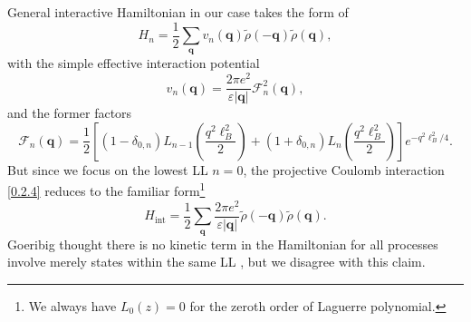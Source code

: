 \documentclass[bachelor,english,numbers]{ustcthesis}
\begin{document}
		General interactive Hamiltonian in our case takes the form of \cite{nomura2006quantum,goerbig2006electron}
		\begin{equation}\label{0.2.4}
			H_n=\dfrac{1}{2}\sum_{\bm{q}}v_n(\bm{q})\widetilde{\rho}(\bm{-q})\widetilde{\rho}(\bm{q}),  
		\end{equation}
		with the simple effective interaction potential
		\begin{equation*}
			v_n(\bm{q})=\dfrac{2\pi e^2}{\varepsilon|\bm{q}|}\mathcal{F}_n^2(\bm{q}),
		\end{equation*}
		and the former factors
		\begin{equation*}
			\mathcal{F}_n(\bm{q})=\dfrac{1}{2}\left[(1-\delta_{0,n})L_{n-1}\left(\dfrac{q^2\ell_B^2}{2}\right)+(1+\delta_{0,n})L_{n}\left(\dfrac{q^2\ell_B^2}{2}\right)\right]e^{-q^2\ell_B^2/4}.
		\end{equation*}
		But since we focus on the lowest LL $n=0$, the projective Coulomb interaction \eqref{0.2.4} reduces to the familiar form\footnote{We always have $L_0(z)=0$ for the zeroth order of Laguerre polynomial.}
		\begin{equation}\label{0.2.5}
			H_{\text{int}}=\dfrac{1}{2}\sum_{\bm{q}}\dfrac{2\pi e^2}{\varepsilon|\bm{q}|}\widetilde{\rho}(\bm{-q})\widetilde{\rho}(\bm{q}).
		\end{equation}
		Goeribig thought there is no kinetic term in the Hamiltonian for all processes involve merely states within the same LL \cite{goerbig2011electronic}, but we disagree with this claim. 
\iffalse
\end{document}
